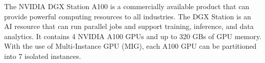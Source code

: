 \documentclass[sigplan,screen]{acmart}
\begin{document}
The NVIDIA DGX Station A100 \cite{www-dgx-station-a100} is a
commercially available product that can provide powerful computing
resources to all industries. The DGX Station is an AI resource that
can run parallel jobs and support training, inference, and data
analytics. It contains 4 NVIDIA A100 GPUs and up to 320 GBs of GPU
memory. With the use of Multi-Instance GPU (MIG), each A100 GPU can be
partitioned into 7 isolated instances.


%
%
%
\newcommand{\nvidia}[1]{
\ifthenelse{\equal{#1}{A100}}{\href{https://www.nvidia.com/en-us/data-center/a100/}{NVIDIA #1}}{}%
\ifthenelse{\equal{#1}{V100}}{\href{https://www.nvidia.com/en-us/data-center/a100/}{NVIDIA #1}}{}%
\ifthenelse{\equal{#1}{K80}}{\href{https://www.nvidia.com/en-gb/data-center/tesla-k80/}{NVIDIA #1}}{}%
\ifthenelse{\equal{#1}{P100}}{\href{https://www.nvidia.com/en-us/data-center/tesla-p100/}{NVIDIA #1}}{}%
\ifthenelse{\equal{#1}{RTX3090}}{\href{https://www.nvidia.com/en-us/geforce/graphics-cards/30-series/rtx-3090/}{NVIDIA #1}}{}%
\ifthenelse{\equal{#1}{RTX2080TI}}{\href{https://www.nvidia.com/en-eu/geforce/20-series/}{NVIDIA #1}}{}%
\ifthenelse{\equal{#1}{Volta}}{\href{https://www.nvidia.com/en-us/data-center/volta-gpu-architecture/}{NVIDIA #1}}{}%
}
\end{document}
